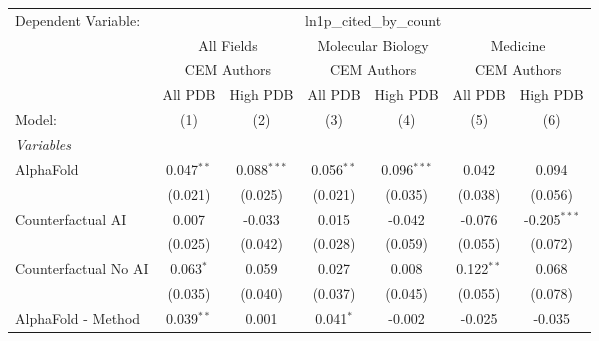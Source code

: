 \begingroup
\centering
\begin{tabular}{lcccccc}
   \tabularnewline \midrule \midrule
   Dependent Variable: & \multicolumn{6}{c}{ln1p\_cited\_by\_count}\\
 & \multicolumn{2}{c}{All Fields} & \multicolumn{2}{c}{Molecular Biology} & \multicolumn{2}{c}{Medicine} \\
\cmidrule(lr){2-3} \cmidrule(lr){4-5} \cmidrule(lr){6-7}
 & \multicolumn{2}{c}{CEM Authors} & \multicolumn{2}{c}{CEM Authors} & \multicolumn{2}{c}{CEM Authors} \\
\cmidrule(lr){2-3} \cmidrule(lr){4-5} \cmidrule(lr){6-7}
 & \multicolumn{1}{c}{All PDB} & \multicolumn{1}{c}{High PDB} & \multicolumn{1}{c}{All PDB} & \multicolumn{1}{c}{High PDB} & \multicolumn{1}{c}{All PDB} & \multicolumn{1}{c}{High PDB} \\
\cmidrule(lr){2-2} \cmidrule(lr){3-3} \cmidrule(lr){4-4} \cmidrule(lr){5-5} \cmidrule(lr){6-6} \cmidrule(lr){7-7}
   Model:                                                     & (1)          & (2)           & (3)          & (4)           & (5)           & (6)\\  
   \midrule
   \emph{Variables}\\
   AlphaFold                                                  & 0.047$^{**}$ & 0.088$^{***}$ & 0.056$^{**}$ & 0.096$^{***}$ & 0.042         & 0.094\\   
                                                              & (0.021)      & (0.025)       & (0.021)      & (0.035)       & (0.038)       & (0.056)\\   
   Counterfactual AI                                          & 0.007        & -0.033        & 0.015        & -0.042        & -0.076        & -0.205$^{***}$\\   
                                                              & (0.025)      & (0.042)       & (0.028)      & (0.059)       & (0.055)       & (0.072)\\   
   Counterfactual No AI                                       & 0.063$^{*}$  & 0.059         & 0.027        & 0.008         & 0.122$^{**}$  & 0.068\\   
                                                              & (0.035)      & (0.040)       & (0.037)      & (0.045)       & (0.055)       & (0.078)\\   
   AlphaFold - Method                                         & 0.039$^{**}$ & 0.001         & 0.041$^{*}$  & -0.002        & -0.025        & -0.035\\   

\end{tabular}
